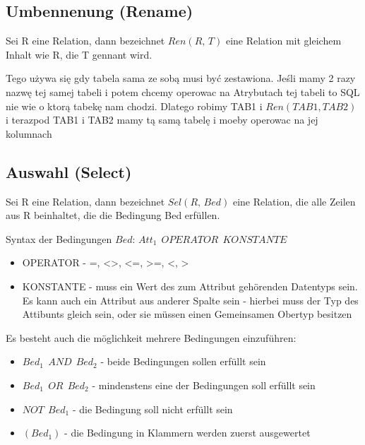 \subsection{Umbennenung (Rename)}
Sei R eine Relation, dann bezeichnet $Ren(R,\,T)$ eine Relation mit gleichem Inhalt wie R, die T gennant wird. 

\begin{tcolorbox}[red, title={Hinweis}]
    Tego używa się gdy tabela sama ze sobą musi być zestawiona. Jeśli mamy 2 razy nazwę tej samej tabeli i potem chcemy operowac na Atrybutach tej tabeli to SQL nie wie o ktorą tabekę nam chodzi. Dlatego robimy TAB1 i $Ren(TAB1, TAB2)$ i terazpod TAB1 i TAB2 mamy tą samą tabelę i moeby operowac na jej kolumnach
\end{tcolorbox}

\subsection{Auswahl (Select)}
Sei R eine Relation, dann bezeichnet $Sel(R,\, Bed)$ eine Relation, die alle Zeilen aus R beinhaltet, die die Bedingung Bed erfüllen.

\begin{tcolorbox}[blue, title={Syntax}]
Syntax der Bedingungen $Bed$: $Att_1\ \ OPERATOR\ \ KONSTANTE$
\begin{itemize}
    \item OPERATOR - =, <>, <=, >=, <, >
    \item KONSTANTE - muss ein Wert des zum Attribut gehörenden Datentyps sein. Es kann auch ein Attribut aus anderer Spalte sein - hierbei muss der Typ des Attibunts gleich sein, oder sie müssen einen Gemeinsamen Obertyp besitzen
\end{itemize}
\end{tcolorbox}

Es besteht auch die möglichkeit mehrere Bedingungen einzuführen:
\begin{itemize}
    \item $Bed_1\ \  AND\ \ Bed_2$ - beide Bedingungen sollen erfüllt sein
    \item $Bed_1\ \  OR\ \ Bed_2$ - mindenstens eine der Bedingungen soll erfüllt sein
    \item $NOT\ \ Bed_1$ - die Bedingung soll nicht erfüllt sein
    \item $(Bed_1)$ - die Bedingung in Klammern werden zuerst ausgewertet
\end{itemize}

\vspace{0.5cm}
